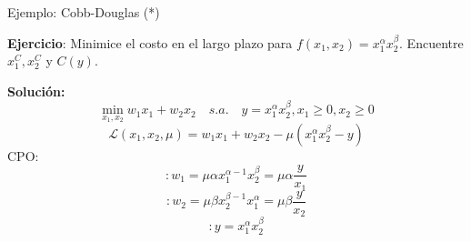 \documentclass{beamer}
\theoremstyle{definition}
\begin{document}

\begin{frame}[noframenumbering]{Ejemplo: Cobb-Douglas (*)}

\textbf{Ejercicio}: Minimice el costo en el largo plazo para $f(x_1,x_2)=x^{\alpha}_{1}x^{\beta}_{2}$. Encuentre $x_1^C, x_2^C$ y $C(y)$.

\color{gray}
\textbf{Solución:}
		\begin{equation*}
		\min_{x_{1},x_{2}}w_{1}x_{1}+w_{2}x_{2} \quad s.a. \quad y=x^{\alpha}_{1}x^{\beta}_{2}, x_{1}\geq 0,x_{2}\geq 0
		\end{equation*}
		\begin{equation*}
		\mathcal{L}(x_{1},x_{2},\mu)=w_{1}x_{1}+w_{2}x_{2}-\mu(x^{\alpha}_{1}x^{\beta}_{2}-y)
		\end{equation*}
CPO:
\begin{equation*}
[x_{1}]: w_{1}=\mu\alpha x^{\alpha-1}_{1}x^{\beta}_{2}=\mu\alpha\frac{y}{x_{1}}
\end{equation*}		
\begin{equation*}
[x_{2}]: w_{2}=\mu\beta x^{\beta-1}_{2}x^{\alpha}_{1}=\mu\beta\frac{y}{x_{2}}
\end{equation*}		
\begin{equation*}
[\mu]: y=x^{\alpha}_{1}x^{\beta}_{2}
\end{equation*}
\end{frame}
\end{document}
